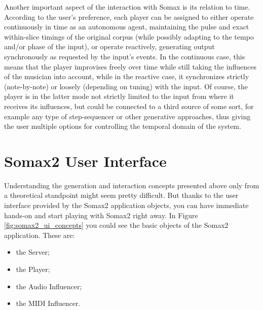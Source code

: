 Another important aspect of the interaction with Somax is its relation to time. According to the user's preference, each player can be assigned to either operate continuously in time as an autonomous agent, maintaining the pulse and exact within-slice timings of the original corpus (while possibly adapting to the tempo and/or phase of the input), or operate reactively, generating output synchronously as requested by the input's events. In the continuous case, this means that the player improvises freely over time while still taking the influences of the musician into account, while in the reactive case, it synchronizes strictly (note-by-note) or loosely (depending on tuning) with the input. Of course, the player is in the latter mode not strictly limited to the input from where it receives its influences, but could be connected to a third source of some sort, for example any type of step-sequencer or other generative approaches, thus giving the user multiple options for controlling the temporal domain of the system.

\section{Somax2 User Interface}

Understanding the generation and interaction concepts presented above only from a theoretical standpoint might seem pretty difficult. But thanks to the user interface provided by the Somax2 application objects, you can have immediate hands-on and start playing with Somax2 right away.
In Figure \ref{fig:somax2_ui_concepts} you could see the basic objects of the Somax2 application. These are:
\begin{itemize}
    \item the Server;
    \item the Player;
    \item the Audio Influencer;
    \item the MIDI Influencer.
\end{itemize}




